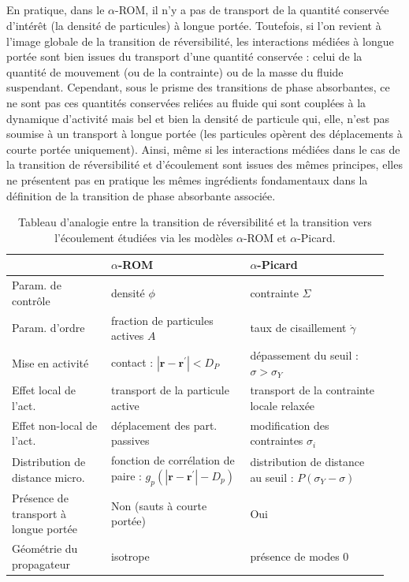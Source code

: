 \subparagraph{}En pratique, dans le $\alpha$-ROM, il n'y a pas de transport de la quantité conservée d'intérêt (la densité de particules) à longue portée. Toutefois, si l'on revient à l'image globale de la transition de réversibilité, les interactions médiées à longue portée sont bien issues du transport d'une quantité conservée : celui de la quantité de mouvement (ou de la contrainte) ou de la masse du fluide suspendant. Cependant, sous le prisme des transitions de phase absorbantes, ce ne sont pas ces quantités conservées reliées au fluide qui sont couplées à la dynamique d'activité mais bel et bien la densité de particule qui, elle, n'est pas soumise à un transport à longue portée (les particules opèrent des déplacements à courte portée uniquement). Ainsi, même si les interactions médiées dans le cas de la transition de réversibilité et d'écoulement sont issues des mêmes principes, elles ne présentent pas en pratique les mêmes ingrédients fondamentaux dans la définition de la transition de phase absorbante associée.

\begingroup

\setlength{\tabcolsep}{10pt}
\renewcommand{\arraystretch}{1.5}

\begin{table}[h]
\centering
\begin{tabular}{P{0.25\linewidth}P{0.35\linewidth}P{0.35\linewidth}}
\hline \hline  & $\alpha$-ROM & $\alpha$-Picard \\
\hline
Param. de contrôle  & densité $\phi$ & contrainte $\Sigma$ \\
Param. d'ordre & fraction de particules actives $A$ & taux de cisaillement $\dot{\gamma}$ \\
Mise en activité & contact : $|\mathbf{r}-\mathbf{r}^\prime| < D_P$ & dépassement du seuil : $\sigma > \sigma_Y$\\
Effet local de l'act. & transport de la particule active & transport de la contrainte locale relaxée \\
Effet non-local de l'act. & déplacement des part. passives & modification des contraintes $\sigma_i$ \\
Distribution de distance micro.  & fonction de corrélation de paire : $g_p(|\mathbf{r}-\mathbf{r}^\prime|-D_p)$ & distribution de distance au seuil : $P(\sigma_Y - \sigma)$\\
\hline 
Présence de transport à longue portée & Non (sauts à courte portée) & Oui \\
Géométrie du propagateur & isotrope & présence de modes 0 \\
\hline \hline
\end{tabular}
\caption{Tableau d'analogie entre la transition de réversibilité et la transition vers l'écoulement étudiées via les modèles $\alpha$-ROM et $\alpha$-Picard.}
\label{tab:analogie}
\end{table}

